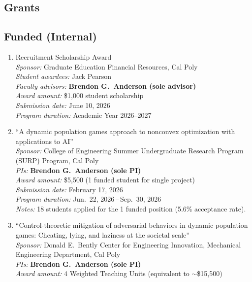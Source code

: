 \begin{grants}
\section{Grants}
\subsection{Funded (Internal)}
\begin{enumerate}[label={\arabic*.}]
	\item Recruitment Scholarship Award \\
	\textit{Sponsor:} Graduate Education Financial Resources, Cal Poly \\
	\textit{Student awardees:} Jack Pearson \\
	\textit{Faculty advisors:} \textbf{Brendon G.\ Anderson (sole advisor)} \\
	\textit{Award amount:} \$1,000 student scholarship \\
	\textit{Submission date:} June 10, 2026 \\
	\textit{Program duration:} Academic Year 2026--2027
	\item ``A dynamic population games approach to nonconvex optimization with applications to AI'' \\
	\textit{Sponsor:} College of Engineering Summer Undergraduate Research Program (SURP) Program, Cal Poly \\
	\textit{PIs:} \textbf{Brendon G.\ Anderson (sole PI)} \\
	\textit{Award amount:} \$5,500 (1 funded student for single project) \\
	\textit{Submission date:} February 17, 2026 \\
	\textit{Program duration:} Jun.\ 22, 2026\,--\,Sep.\ 30, 2026 \\
	\textit{Notes:} 18 students applied for the 1 funded position (5.6\% acceptance rate).
	\item ``Control-theoretic mitigation of adversarial behaviors in dynamic population games: Cheating, lying, and laziness at the societal scale'' \\
	\textit{Sponsor:} Donald E.\ Bently Center for Engineering Innovation, Mechanical Engineering Department, Cal Poly \\
	\textit{PIs:} \textbf{Brendon G.\ Anderson (sole PI)} \\
	\textit{Award amount:} 4 Weighted Teaching Units (equivalent to $\sim$\$15,500) \\

\end{enumerate}
\end{grants}
